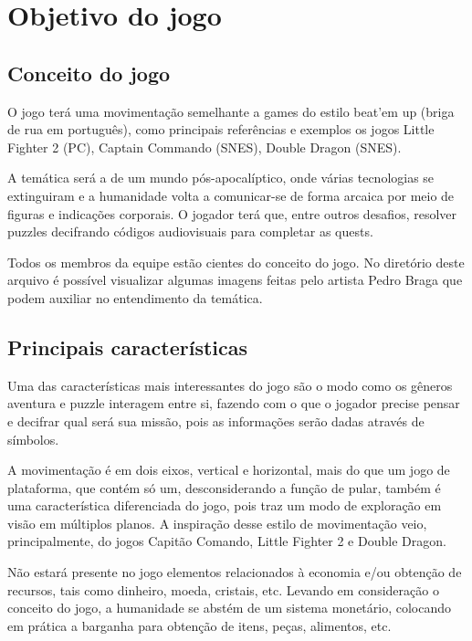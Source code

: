 \documentclass[12pt]{article}
\begin{document}
\newpage

\listoffigures

\newpage
\section{Objetivo do jogo}

\subsection{Conceito do jogo}
O jogo terá uma movimentação semelhante a games do estilo beat'em up (briga de
rua em português), como principais referências e exemplos os jogos Little
Fighter 2 (PC), Captain Commando (SNES), Double Dragon (SNES).

A temática será a de um mundo pós-apocalíptico, onde várias tecnologias se
extinguiram e a humanidade volta a comunicar-se de forma arcaica por meio de
figuras e indicações corporais. O jogador terá que, entre outros desafios,
resolver puzzles decifrando códigos audiovisuais para completar as quests.

Todos os membros da equipe estão cientes do conceito do jogo. No diretório
deste arquivo é possível visualizar algumas imagens feitas pelo artista Pedro
Braga que podem auxiliar no entendimento da temática.

\subsection{Principais características}
Uma das características mais interessantes do jogo são o modo como os gêneros
aventura e puzzle interagem entre si, fazendo com o que o jogador precise
pensar e decifrar qual será sua missão, pois as informações serão dadas
através de símbolos.

A movimentação é em dois eixos, vertical e horizontal, mais do que um jogo de
plataforma, que contém só um, desconsiderando a função de pular, também é uma
característica diferenciada do jogo, pois traz um modo de exploração em visão
em múltiplos planos. A inspiração desse estilo de movimentação veio,
principalmente, do jogos Capitão Comando, Little Fighter 2 e Double Dragon.

Não estará presente no jogo elementos relacionados à economia e/ou obtenção de
recursos, tais como dinheiro, moeda, cristais, etc. Levando em consideração o
conceito do jogo, a humanidade se abstém de um sistema monetário, colocando em
prática a barganha para obtenção de itens, peças, alimentos, etc.
\end{document}
